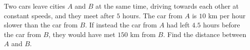Two cars leave cities $A$ and $B$ at the same time, driving towards each other at constant speeds, and they meet after $5$ hours. The car from $A$ is $10$ km per hour slower than the car from $B$. If instead the car from $A$ had left $4.5$ hours before the car from $B$, they would have met $150$ km from $B$. Find the distance between $A$ and $B$.
